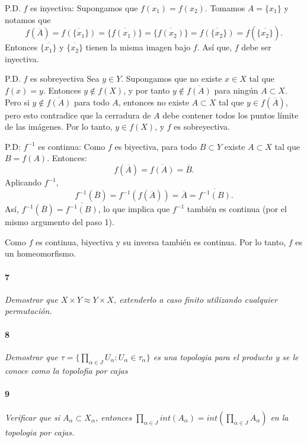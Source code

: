 \documentclass[12pt]{article}
\begin{document}
P.D. \( f \) es inyectiva: Supongamos que \( f(x_1) = f(x_2) \). Tomamos \( A = \{x_1\} \) y notamos que
\[
f(\overline{A}) = \overline{f(\{x_1\})} = \overline{\{f(x_1)\}} = \overline{\{f(x_2)\}} = \overline{f(\{x_2\})} = f(\overline{\{x_2\}}).
\]
Entonces \( \overline{\{x_1\}} \) y \( \overline{\{x_2\}} \) tienen la misma imagen bajo \( f \). Así que, \( f \) debe ser inyectiva.

P.D. \( f \) es sobreyectiva 
Sea \( y \in Y \). Supongamos que no existe \( x \in X \) tal que \( f(x) = y \). Entonces \( y \notin f(X) \), y por tanto \( y \notin \overline{f(A)} \) para ningún \( A \subset X \).  
Pero si \( y \notin \overline{f(A)} \) para todo \( A \), entonces no existe \( A \subset X \) tal que \( y \in f(\overline{A}) \), pero esto contradice que la cerradura de \( A \) debe contener todos los puntos límite de las imágenes.  
Por lo tanto, \( y \in f(X) \), y \( f \) es sobreyectiva.


P.D: \( f^{-1} \) es continua: Como \( f \) es biyectiva, para todo \( B \subset Y \) existe \( A \subset X \) tal que \( B = f(A) \). Entonces:
\[
f(\overline{A}) = \overline{f(A)} = \overline{B}.
\]
Aplicando \( f^{-1} \),
\[
f^{-1}(\overline{B}) = f^{-1}(f(\overline{A})) = \overline{A} = \overline{f^{-1}(B)}.
\]
Así, \( f^{-1}(\overline{B}) = \overline{f^{-1}(B)} \), lo que implica que \( f^{-1} \) también es continua (por el mismo argumento del paso 1).

Como \( f \) es continua, biyectiva y su inversa también es continua. Por lo tanto, \( f \) es un homeomorfismo. 


\paragraph{7}
\textit{Demostrar que $X\times Y \approx Y \times X$, extenderlo a caso finito utilizando cualquier permutación.}
 
\paragraph{8}
\textit{Demostrar que $\tau = \{\prod\limits_{\alpha\in J}U_\alpha : U_\alpha\in\tau_\alpha\}$ es una topologia para el producto y se le conoce como la topolofia por cajas}

\paragraph{9}
\textit{Verificar que si $A_{\alpha}\subset X_{\alpha}$, entonces $\prod\limits_{\alpha\in J } int(A_{\alpha}) = int(\prod\limits_{\alpha\in J }A_{\alpha})$ en la topologia por cajas.}
\end{document}
